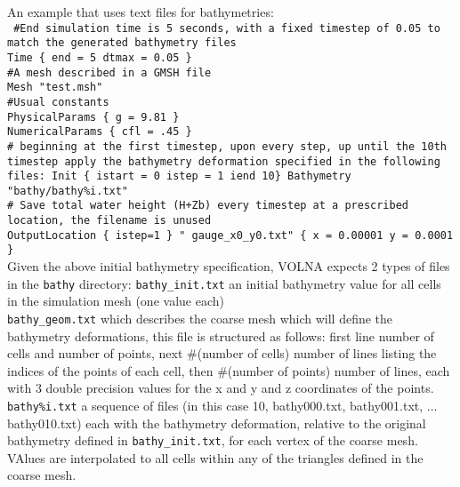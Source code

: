 \documentclass[11pt]{article}
\begin{document}
An example that uses text files for bathymetries: \\
{\tt
\#End simulation time is 5 seconds, with a fixed timestep of 0.05 to match the generated bathymetry files \\
Time \{ end = 5 dtmax = 0.05 \} \\
\#A mesh described in a GMSH file \\
Mesh "test.msh" \\
\#Usual constants \\
PhysicalParams \{ g = 9.81 \} \\
NumericalParams \{ cfl = .45 \} \\
\# beginning at the first timestep, upon every step, up until the 10th timestep apply the bathymetry deformation specified in the following files:
Init \{ istart = 0 istep = 1 iend 10\} Bathymetry "bathy/bathy\%i.txt" \\
\# Save total water height (H+Zb) every timestep at a prescribed location, the filename is unused \\
OutputLocation \{ istep=1 \} " gauge\_x0\_y0.txt" \{ x = 0.00001 y = 0.0001 \}
}
\\
Given the above initial bathymetry specification, VOLNA expects 2 types of files in the \texttt{bathy} directory:
\texttt{bathy\_init.txt} an initial bathymetry value for all cells in the simulation mesh (one value each) \\
\texttt{bathy\_geom.txt} which describes the coarse mesh which will define the bathymetry deformations, this file is structured as follows: first line number of cells and number of points, next \#(number of cells) number of lines listing the indices of the points of each cell, then \#(number of points) number of lines, each with 3 double precision values for the x and y and z coordinates of the points.\\
\texttt{bathy\%i.txt} a sequence of files (in this case 10, bathy000.txt, bathy001.txt, ... bathy010.txt) each with the bathymetry deformation, relative to the original bathymetry defined in \texttt{bathy\_init.txt}, for each vertex of the coarse mesh. VAlues are interpolated to all cells within any of the triangles defined in the coarse mesh.

\end{document}
